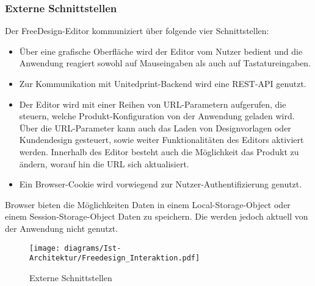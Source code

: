 \subsubsection{Externe Schnittstellen}
Der FreeDesign-Editor kommuniziert über folgende vier Schnittstellen:
\begin{itemize}
	\item Über eine grafische Oberfläche wird der Editor vom Nutzer bedient und die Anwendung reagiert sowohl auf Mauseingaben als auch auf Tastatureingaben. 
	\item Zur Kommunikation mit Unitedprint-Backend wird eine REST-API genutzt. 
	\item Der Editor wird mit einer Reihen von URL-Parametern aufgerufen, die steuern, welche Produkt-Konfiguration von der Anwendung geladen wird. Über die URL-Parameter kann auch das Laden von Designvorlagen oder Kundendesign gesteuert, sowie weiter Funktionalitäten des Editors aktiviert werden. 
	Innerhalb des Editor besteht auch die Möglichkeit das Produkt zu ändern, worauf hin die URL sich aktualisiert.
	\item Ein Browser-Cookie wird vorwiegend zur Nutzer-Authentifizierung genutzt. 
\end{itemize}

Browser bieten die Möglichkeiten Daten in einem Local-Storage-Object oder einem Session-Storage-Object Daten zu speichern. \autocite{Mozilla:Storage}
Die werden jedoch aktuell von der Anwendung nicht genutzt. 


\begin{figure}[H]
    \centering
    \texttt{[image: diagrams/Ist-Architektur/Freedesign\_Interaktion.pdf]}
     \caption{Externe Schnittstellen}
     \label{fig:Externe_Schnittstellen}
  \end{figure}
  